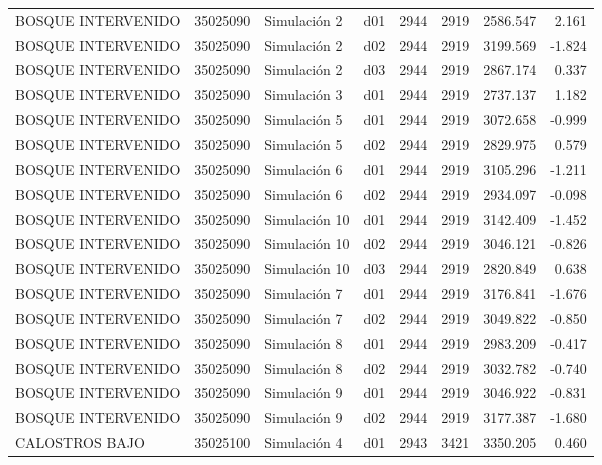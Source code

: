 \begin{landscape}
\begin{longtable}{lrlp{2cm}p{2cm}p{3cm}p{2cm}r}
      BOSQUE INTERVENIDO &  35025090 &   Simulación 2 &   d01 &      2944 &     2919 &  2586.547 &     2.161 \\
      BOSQUE INTERVENIDO &  35025090 &   Simulación 2 &   d02 &      2944 &     2919 &  3199.569 &    -1.824 \\
      BOSQUE INTERVENIDO &  35025090 &   Simulación 2 &   d03 &      2944 &     2919 &  2867.174 &     0.337 \\
      BOSQUE INTERVENIDO &  35025090 &   Simulación 3 &   d01 &      2944 &     2919 &  2737.137 &     1.182 \\
      BOSQUE INTERVENIDO &  35025090 &   Simulación 5 &   d01 &      2944 &     2919 &  3072.658 &    -0.999 \\
      BOSQUE INTERVENIDO &  35025090 &   Simulación 5 &   d02 &      2944 &     2919 &  2829.975 &     0.579 \\
      BOSQUE INTERVENIDO &  35025090 &   Simulación 6 &   d01 &      2944 &     2919 &  3105.296 &    -1.211 \\
      BOSQUE INTERVENIDO &  35025090 &   Simulación 6 &   d02 &      2944 &     2919 &  2934.097 &    -0.098 \\
      BOSQUE INTERVENIDO &  35025090 &  Simulación 10 &   d01 &      2944 &     2919 &  3142.409 &    -1.452 \\
      BOSQUE INTERVENIDO &  35025090 &  Simulación 10 &   d02 &      2944 &     2919 &  3046.121 &    -0.826 \\
      BOSQUE INTERVENIDO &  35025090 &  Simulación 10 &   d03 &      2944 &     2919 &  2820.849 &     0.638 \\
      BOSQUE INTERVENIDO &  35025090 &   Simulación 7 &   d01 &      2944 &     2919 &  3176.841 &    -1.676 \\
      BOSQUE INTERVENIDO &  35025090 &   Simulación 7 &   d02 &      2944 &     2919 &  3049.822 &    -0.850 \\
      BOSQUE INTERVENIDO &  35025090 &   Simulación 8 &   d01 &      2944 &     2919 &  2983.209 &    -0.417 \\
      BOSQUE INTERVENIDO &  35025090 &   Simulación 8 &   d02 &      2944 &     2919 &  3032.782 &    -0.740 \\
      BOSQUE INTERVENIDO &  35025090 &   Simulación 9 &   d01 &      2944 &     2919 &  3046.922 &    -0.831 \\
      BOSQUE INTERVENIDO &  35025090 &   Simulación 9 &   d02 &      2944 &     2919 &  3177.387 &    -1.680 \\
          CALOSTROS BAJO &  35025100 &   Simulación 4 &   d01 &      2943 &     3421 &  3350.205 &     0.460 \\

\end{longtable}
\end{landscape}
